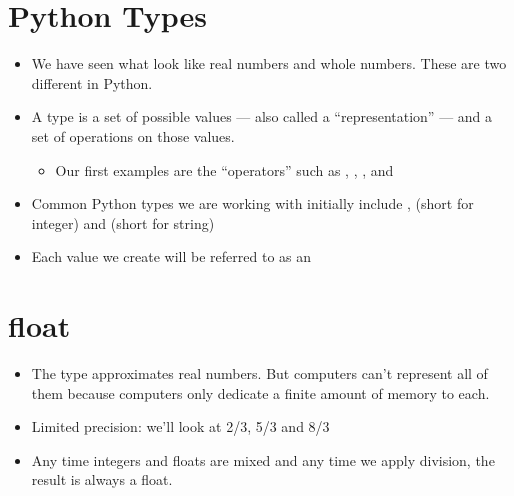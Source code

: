\documentclass[letterpaper,10pt,english]{sphinxmanual}
\begin{document}
\section{Python Types}
\label{\detokenize{lecture_notes/lec02_calculator:python-types}}\begin{itemize}
\item {} 
We have seen what look like real numbers and whole numbers.  These
are two different  in Python.

\item {} 
A type is a set of possible values — also called a “representation” —
and a set of operations on those values.
\begin{itemize}
\item {} 
Our first examples are the “operators” such as \sphinxcode{\sphinxupquote{+}}, \sphinxcode{\sphinxupquote{-}}, \sphinxcode{\sphinxupquote{*}}, \sphinxcode{\sphinxupquote{/}} and \sphinxcode{\sphinxupquote{**}}

\end{itemize}

\item {} 
Common Python types we are working with initially include
,  (short for integer) and  (short for string)

\item {} 
Each value we create will be referred to as an 

\end{itemize}


\section{float}
\label{\detokenize{lecture_notes/lec02_calculator:float}}\begin{itemize}
\item {} 
The  type approximates real numbers.  But computers can’t
represent all of them because computers only dedicate a finite
amount of memory to each.

\item {} 
Limited precision:  we’ll look at 2/3, 5/3 and 8/3

\item {} 
Any time integers and floats are mixed and any time we apply
division, the result is always a float.

\end{itemize}
\end{document}
